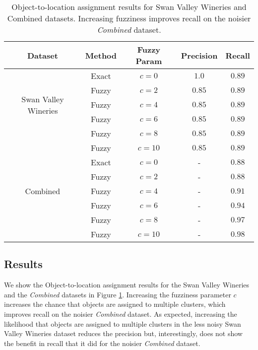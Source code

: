 \small{
\begin{table}[h!]
    \begin{center}
        \begin{tabular}{ |c|c|c|c|c| } 
            \hline
            Dataset & Method & Fuzzy Param & Precision & Recall \\
            \hline
            \multirow{5}{4em}{Swan Valley Wineries} 
                & Exact & $c = 0$ & $1.0$ & $0.89$  \\ 
                & Fuzzy & $c = 2$ & $0.85$ & $0.89$  \\ 
                & Fuzzy & $c = 4$ & $0.85$ & $0.89$  \\
                & Fuzzy & $c = 6$ & $0.85$ & $0.89$  \\ 
                & Fuzzy & $c = 8$ & $0.85$ & $0.89$  \\ 
                & Fuzzy & $c = 10$ & $0.85$ & $0.89$  \\ 
            \hline
            \multirow{5}{4em}{Combined} 
                & Exact & $c = 0$ & - & $0.88$  \\ 
                & Fuzzy & $c = 2$ & - & $0.88$  \\ 
                & Fuzzy & $c = 4$ & - & $0.91$  \\ 
                & Fuzzy & $c = 6$ & - & $0.94$  \\ 
                & Fuzzy & $c = 8$ & - & $0.97$  \\ 
                & Fuzzy & $c = 10$ & - & $0.98$  \\ 
            \hline
        \end{tabular}
        \caption{ Object-to-location assignment results for Swan Valley Wineries and Combined datasets. Increasing fuzziness improves recall on the noisier \textit{Combined} dataset.} %
        \label{table:clustering}
    \end{center}
\end{table}
}
\normalsize


\subsection{Results}
We show the Object-to-location assignment results for the Swan Valley Wineries and the \textit{Combined} datasets in Figure \ref{table:clustering}. 
Increasing the fuzziness parameter $c$ increases the chance that objects are assigned to multiple clusters, which improves recall on the noisier \textit{Combined} dataset.
As expected, increasing the likelihood that objects are assigned to multiple clusters in the less noisy Swan Valley Wineries dataset reduces the precision but, interestingly, does not show the benefit in recall that it did for the noisier \textit{Combined} dataset.

